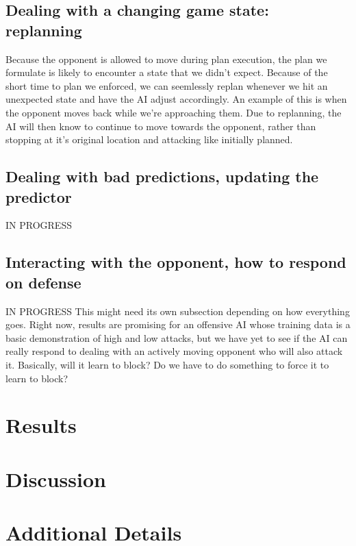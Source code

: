 \documentclass{article}
\begin{document}
\subsection{Dealing with a changing game state: replanning}
Because the opponent is allowed to move during plan execution, the plan we formulate is likely to encounter a state that we didn't expect. Because of the short time to plan we enforced, we can seemlessly replan whenever we hit an unexpected state and have the AI adjust accordingly. An example of this is when the opponent moves back while we're approaching them. Due to replanning, the AI will then know to continue to move towards the opponent, rather than stopping at it's original location and attacking like initially planned.

\subsection{Dealing with bad predictions, updating the predictor}
IN PROGRESS

\subsection{Interacting with the opponent, how to respond on defense}
IN PROGRESS
This might need its own subsection depending on how everything goes. Right now, results are promising for an offensive AI whose training data is a basic demonstration of high and low attacks, but we have yet to see if the AI can really respond to dealing with an actively moving opponent who will also attack it. Basically, will it learn to block? Do we have to do something to force it to learn to block?


\section{Results}

\section{Discussion}

\section{Additional Details}
\end{document}

